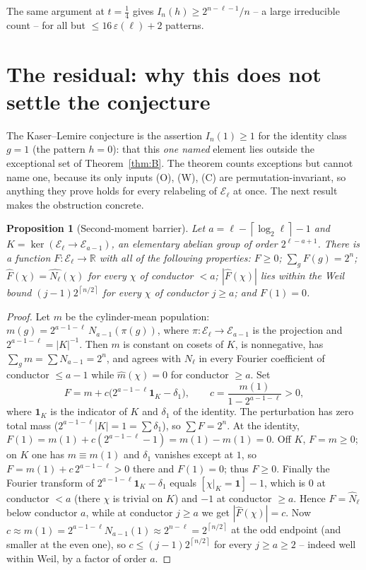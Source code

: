 \documentclass[10pt]{article}
\theoremstyle{plain}
\newtheorem{proposition}{Proposition}
\newcommand{\E}{\mathcal E}
\newcommand{\ceil}[1]{\left\lceil #1\right\rceil}
\newcommand{\one}{\mathbf 1}
\begin{document}
The same argument at $t=\tfrac14$ gives $I_n(h)\ge2^{n-\ell-1}/n$ -- a large
irreducible count -- for all but $\le16\,\varepsilon(\ell)+2$ patterns.

\section{The residual: why this does not settle the conjecture}\label{sec:residual}

The Kaser--Lemire conjecture is the assertion $I_n(1)\ge1$ for the identity
class $g=1$ (the pattern $h=0$): that this \emph{one named} element lies
outside the exceptional set of Theorem~\ref{thm:B}. The theorem counts
exceptions but cannot name one, because its only inputs (O), (W), (C) are
permutation-invariant, so anything they prove holds for every relabeling of
$\E_\ell$ at once. The next result makes the obstruction concrete.

\begin{proposition}[Second-moment barrier]\label{prop:barrier}
Let $a=\ell-\ceil{\log_2\ell}-1$ and $K=\ker(\E_\ell\to\E_{a-1})$, an
elementary abelian group of order $2^{\ell-a+1}$. There is a function
$F\colon\E_\ell\to\mathbb R$ with all of the following properties: $F\ge0$;
$\sum_g F(g)=2^n$; $\widehat F(\chi)=\widehat{N_\ell}(\chi)$ for every $\chi$ of
conductor $<a$; $|\widehat F(\chi)|$ lies within the Weil bound
$(j-1)2^{\ceil{n/2}}$ for every $\chi$ of conductor $j\ge a$; and $F(1)=0$.
\end{proposition}

\begin{proof}
Let $m$ be the cylinder-mean population: $m(g)=2^{a-1-\ell}\,N_{a-1}(\pi(g))$,
where $\pi\colon\E_\ell\to\E_{a-1}$ is the projection and
$2^{a-1-\ell}=|K|^{-1}$. Then $m$ is constant on cosets of $K$, is
nonnegative, has $\sum_g m=\sum N_{a-1}=2^n$, and agrees with $N_\ell$ in
every Fourier coefficient of conductor $\le a-1$ while $\widehat m(\chi)=0$
for conductor $\ge a$. Set
\[
 F=m+c\bigl(2^{a-1-\ell}\one_K-\delta_1\bigr),
 \qquad c=\frac{m(1)}{1-2^{a-1-\ell}}>0,
\]
where $\one_K$ is the indicator of $K$ and $\delta_1$ of the identity. The
perturbation has zero total mass ($2^{a-1-\ell}|K|=1=\sum\delta_1$), so
$\sum F=2^n$. At the identity,
$F(1)=m(1)+c(2^{a-1-\ell}-1)=m(1)-m(1)=0$. Off $K$, $F=m\ge0$; on $K$ one has
$m\equiv m(1)$ and $\delta_1$ vanishes except at $1$, so
$F=m(1)+c\,2^{a-1-\ell}>0$ there and $F(1)=0$; thus $F\ge0$. Finally the
Fourier transform of $2^{a-1-\ell}\one_K-\delta_1$ equals
$[\chi|_K=\one]-1$, which is $0$ at conductor $<a$ (there $\chi$ is trivial on
$K$) and $-1$ at conductor $\ge a$. Hence $\widehat F=\widehat N_\ell$ below
conductor $a$, while at conductor $j\ge a$ we get $|\widehat F(\chi)|=c$. Now
$c\approx m(1)=2^{a-1-\ell}N_{a-1}(1)\approx2^{n-\ell}=2^{\ceil{n/2}}$ at the
odd endpoint (and smaller at the even one), so $c\le(j-1)2^{\ceil{n/2}}$ for
every $j\ge a\ge2$ -- indeed well within Weil, by a factor of order $a$.
\end{proof}
\end{document}
